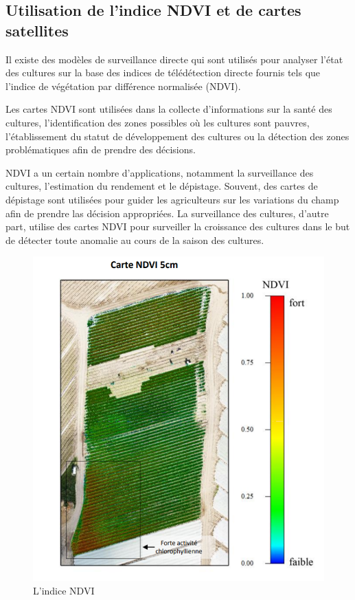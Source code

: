 \documentclass[12pt, openany]{report}
\begin{document}
\subsection{Utilisation de l'indice NDVI et de cartes satellites}

Il existe des modèles de surveillance directe qui sont utilisés pour analyser l'état des cultures sur la base des indices de télédétection directe fournis tels que l'indice de végétation par différence normalisée (NDVI).

Les cartes NDVI sont utilisées dans la collecte d'informations sur la santé des cultures, l'identification des zones possibles où les cultures sont pauvres, l'établissement du statut de développement des cultures ou la détection des zones problématiques afin de prendre des décisions.

NDVI a un certain nombre d'applications, notamment la surveillance des cultures, l'estimation du rendement et le dépistage. Souvent, des cartes de dépistage sont utilisées pour guider les agriculteurs sur les variations du champ afin de prendre las décision appropriées. La surveillance des cultures, d'autre part, utilise des cartes NDVI pour surveiller la croissance des cultures dans le but de détecter toute anomalie au cours de la saison des cultures.

\begin{figure}[H]
\centering
\includegraphics[scale=0.7]{ndvi.png}
\caption{L'indice NDVI}
\end{figure}
\end{document}
